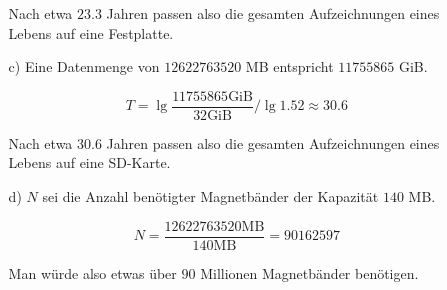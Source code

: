 \documentclass[10pt,a4paper]{article}
\begin{document}
\begin{enumerate}
\begin{enumerate}
                Nach etwa $23.3$ Jahren passen also die gesamten Aufzeichnungen eines Lebens auf eine Festplatte.
            
            \item[c)]
                Eine Datenmenge von $12622763520$ MB entspricht $11755865$ GiB.
            
                $$T = \lg{\frac{11755865 \text{GiB}}{32 \text{GiB}}} / \lg{1.52} \approx 30.6$$
                
                Nach etwa $30.6$ Jahren passen also die gesamten Aufzeichnungen eines Lebens auf eine SD-Karte.
            \item[d)]
                $N$ sei die Anzahl benötigter Magnetbänder der Kapazität $140$ MB.
                
                $$N = \frac{12622763520 \text{MB}}{140 \text{MB}} = 90162597$$
                
                Man würde also etwas über $90$ Millionen Magnetbänder benötigen.
        \end{enumerate}

\end{enumerate}
\end{document}
